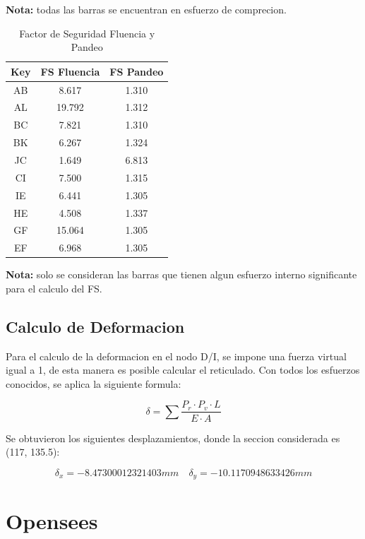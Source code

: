 \textbf{Nota:} todas las barras se encuentran en esfuerzo de comprecion.

\begin{table}[H]
\centering
\begin{tabular}{|c|c|c|}
\hline
\textbf{Key} & \textbf{FS Fluencia} & \textbf{FS Pandeo} \\ 
\hline
AB & 8.617 & 1.310 \\ 
AL & 19.792 & 1.312 \\ 
BC & 7.821 & 1.310 \\ 
BK & 6.267 & 1.324 \\ 
JC & 1.649 & 6.813 \\ 
CI & 7.500 & 1.315 \\ 
IE & 6.441 & 1.305 \\ 
HE & 4.508 & 1.337 \\ 
GF & 15.064 & 1.305 \\ 
EF & 6.968 & 1.305 \\ 
\hline
\end{tabular}
\caption{Factor de Seguridad Fluencia y Pandeo}
\end{table}

\textbf{Nota:} solo se consideran las barras que tienen algun esfuerzo interno significante para el calculo del FS.


\subsection{Calculo de Deformacion}

Para el calculo de la deformacion en el nodo D/I, se impone una fuerza virtual igual a 1, de esta manera es posible calcular el reticulado. Con todos los esfuerzos conocidos, se aplica la siguiente formula:

\begin{equation}
    \delta = \sum   \frac{P_r \cdot P_v \cdot L}{E\cdot A}
\end{equation}

Se obtuvieron los siguientes desplazamientos, donde la seccion considerada es (117, 135.5):

\begin{equation}
    \delta_x = -8.47300012321403 mm \quad \delta_y = -10.1170948633426 mm
\end{equation}

\section{Opensees}

